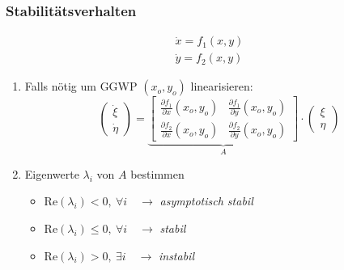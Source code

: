     \subsubsection{Stabilitätsverhalten}
        \vspace{-1em}
        \begin{align*}
            \dot{x} = f_1(x,y)\\
            \dot{y} = f_2(x,y)
        \end{align*}
        \vspace{-0.75em}
        \begin{enumerate}
            \item Falls nötig um GGWP $(x_o,y_o)$ linearisieren:
                  $$
                    \begin{pmatrix}
                        \dot{\xi}\\[0.5em] \dot{\eta}
                    \end{pmatrix}
                    =
                    \underbrace{\begin{bmatrix}
                        \frac{\partial f_1}{\partial x}(x_o, y_o) & \frac{\partial f_1}{\partial y}(x_o, y_o)\\[0.5em]
                        \frac{\partial f_2}{\partial x}(x_o, y_o) & \frac{\partial f_2}{\partial y}(x_o, y_o)
                    \end{bmatrix}}_{A}
                    \cdot 
                    \begin{pmatrix}
                        \xi\\[0.5em] \eta
                    \end{pmatrix}
                  $$
            \item Eigenwerte $\lambda_i$ von $A$ bestimmen
            \begin{itemize}
                \item Re$(\lambda_i) < 0, \ \forall i \quad \to $ \textit{asymptotisch stabil}
                \item Re$(\lambda_i) \leq 0, \ \forall i \quad \to $ \textit{stabil}
                \item Re$(\lambda_i) > 0, \ \exists i \quad \to $ \textit{instabil}
            \end{itemize}
        \end{enumerate}
